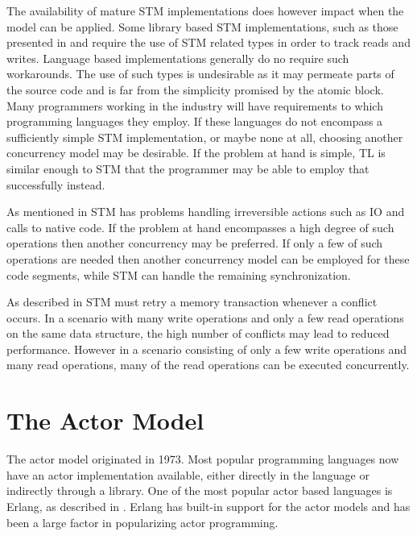 The availability of mature \ac{STM} implementations does however impact when the model can be applied. Some library based \ac{STM} implementations, such as those presented in \cite{ramadan2009committing} and \cite{herlihy2006flexible} require the use of \ac{STM} related types in order to track reads and writes. Language based implementations generally do no require such workarounds. The use of such types is undesirable as it may permeate parts of the source code and is far from the simplicity promised by the atomic block. Many programmers working in the industry will have requirements to which programming languages they employ. If these languages do not encompass a sufficiently simple \ac{STM} implementation, or maybe none at all, choosing another concurrency model may be desirable. If the problem at hand is simple, \ac{TL} is similar enough to \ac{STM} that the programmer may be able to employ that successfully instead.

As mentioned in  STM has problems handling irreversible actions such as \ac{IO} and calls to native code. If the problem at hand encompasses a high degree of such operations then another concurrency may be preferred. If only a few of such operations are needed then another concurrency model can be employed for these code segments, while \ac{STM} can handle the remaining synchronization.

As described in  \ac{STM} must retry a memory transaction whenever a conflict occurs. In a scenario with many write operations and only a few read operations on the same data structure, the high number of conflicts may lead to reduced performance\cite[p. 311]{subramaniam2011programming}. However in a scenario consisting of only a few write operations and many read operations, many of the read operations can be executed concurrently.

\section{The Actor Model}\label{sec:choose_Actor}
The actor model originated in 1973\cite[p. 14]{haller2012actors}. Most popular programming languages now have an actor implementation available\cite[p. 152]{sevenModels}, either directly in the language or indirectly through a library. One of the most popular actor based languages is Erlang, as described in . Erlang has built-in support for the actor models and has been a large factor in popularizing actor programming\cite[p. 152]{sevenModels}.

